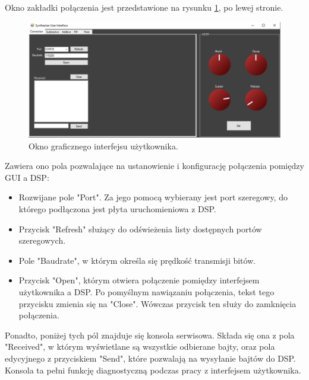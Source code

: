 Okno zakładki połączenia jest przedstawione na rysunku \ref{rys:real_gui}, po lewej stronie. 
\begin{figure}[H]
	\centering
	\includegraphics[width=16cm]{./grafiki/real_gui}
	\captionsetup{justification=centering}
	\caption{Okno graficznego interfejsu użytkownika.}
	\label{rys:real_gui}
\end{figure}
Zawiera ono pola pozwalające na ustanowienie i konfigurację połączenia pomiędzy GUI a DSP:
\begin{itemize}
	\item Rozwijane pole "Port". Za jego pomocą wybierany jest port szeregowy, do którego podłączona jest płyta uruchomieniowa z DSP.
	\item Przycisk "Refresh" służący do odświeżenia listy dostępnych portów szeregowych.
	\item Pole "Baudrate", w którym określa się prędkość transmisji bitów. 
	\item Przycisk "Open", którym otwiera połączenie pomiędzy interfejsem użytkownika a DSP. Po pomyślnym nawiązaniu połączenia, tekst tego przycisku zmienia się na "Close". Wówczas przycisk ten służy do zamknięcia połączenia.
\end{itemize} 



Ponadto, poniżej tych pól znajduje się konsola serwisowa. Składa się ona z pola "Received", w którym wyświetlane są wszystkie odbierane bajty, oraz pola edycyjnego z przyciskiem "Send", które pozwalają na wysyłanie bajtów do DSP. Konsola ta pełni funkcję diagnostyczną podczas pracy z interfejsem użytkownika.

